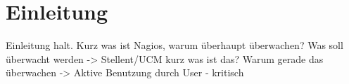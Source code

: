 \section{Einleitung}

Einleitung halt.
Kurz was ist Nagios, warum überhaupt überwachen?
Was soll überwacht werden -> Stellent/UCM kurz was ist das? Warum gerade das überwachen -> Aktive Benutzung durch User - kritisch